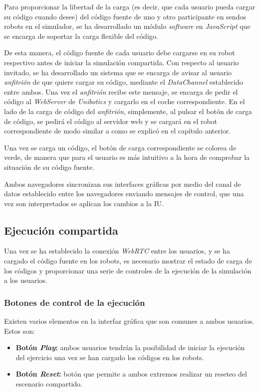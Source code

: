 \documentclass[a4paper, 12pt]{book}
\begin{document}
Para proporcionar la libertad de la carga (es decir, que cada usuario pueda cargar su código cuando desee) del código fuente de uno y otro participante en sendos robots en el simulador, se ha desarrollado un módulo \emph{software} en \emph{JavaScript} que se encarga de soportar la carga flexible del código.

De esta manera, el código fuente de cada usuario debe cargarse en su robot respectivo antes de iniciar la simulación compartida. Con respecto al usuario invitado, se ha desarrollado un sistema que se encarga de avisar al usuario \emph{anfitrión} de que quiere cargar su código, mediante el \emph{DataChannel} establecido entre ambos. Una vez el \emph{anfitrión} recibe este mensaje, se encarga de pedir el código al \emph{WebServer} de \emph{Unibotics} y cargarlo en el coche correspondiente. En el lado de la carga de código del \emph{anfitrión}, simplemente, al pulsar el botón de carga de código, se pedirá el código al servidor web y se cargará en el robot correspondiente de modo similar a como se explicó en el capítulo anterior.

Una vez se carga un código, el botón de carga correspondiente se colorea de verde, de manera que para el usuario es más intuitivo a la hora de comprobar la situación de su código fuente.

Ambos navegadores sincronizan sus interfaces gráficas por medio del canal de datos establecido entre los navegadores enviando mensajes de control, que una vez son interpretados se aplican los cambios a la IU.

\subsection{Ejecución compartida}

Una vez se ha establecido la conexión \emph{WebRTC} entre los usuarios, y se ha cargado el código fuente en los robots, es necesario mostrar el estado de carga de los códigos y proporcionar una serie de controles de la ejecución de la simulación a los usuarios.

\subsubsection{Botones de control de la ejecución}

Existen varios elementos en la interfaz gráfica que son comunes a ambos usuarios. Estos son:

\begin{itemize}
\item \textbf{Botón \emph{Play}:} ambos usuarios tendrán la posibilidad de iniciar la ejecución del ejercicio una vez se han cargado los códigos en los robots.

\item \textbf{Botón \emph{Reset}:} botón que permite a ambos extremos realizar un reseteo del escenario compartido.
\end{itemize}
\end{document}
